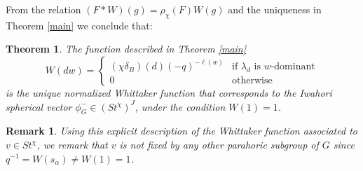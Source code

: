 \documentclass{article}
\newtheorem{remark}{Remark}
\newtheorem{theorem}{Theorem}
\begin{document}
From the relation $(F*W)(g)=\rho_{\chi}(F)W(g)$ and the uniqueness in Theorem \ref{main} we conclude that: 
\begin{theorem} \label{StWhit}
    The function described in Theorem \ref{main} $$W(dw)=\begin{cases}
     (\chi\delta_B)(d)(-q)^{-\ell(w)}  & \text{if $\lambda_d$ is $w$-dominant} \\
        0 & \text{otherwise} 
    \end{cases}$$ is the unique normalized Whittaker function that corresponds to the Iwahori spherical vector $\phi_G^-\in (St^{\chi})^J$, under the condition $W(1)=1$.
\end{theorem}

\begin{remark}
Using this explicit description of the Whittaker function associated to $v\in St^{\chi}$, we remark that $v$ is not fixed by any other parahoric subgroup of $G$ since $q^{-1}=W(s_{\alpha})\ne W(1)=1$.
\end{remark}
\end{document}
